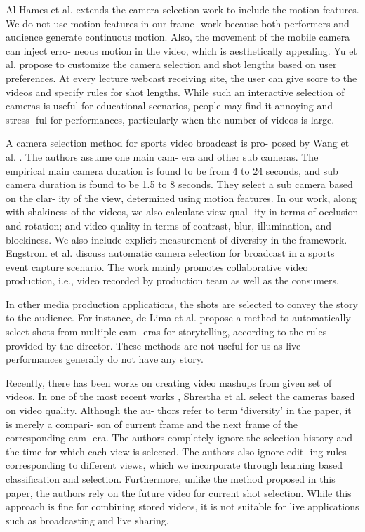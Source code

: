 \documentclass{new}
\begin{document}
Al-Hames et al. \cite{3} extends the camera selection work to include
the motion features. We do not use motion features in our frame-
work because both performers and audience generate continuous
motion. Also, the movement of the mobile camera can inject erro-
neous motion in the video, which is aesthetically appealing. Yu et
al. \cite{20} propose to customize the camera selection and shot lengths
based on user preferences. At every lecture webcast receiving site,
the user can give score to the videos and specify rules for shot
lengths. While such an interactive selection of cameras is useful
for educational scenarios, people may find it annoying and stress-
ful for performances, particularly when the number of videos is
large.

A camera selection method for sports video broadcast is pro-
posed by Wang et al. \cite{16}. The authors assume one main cam-
era and other sub cameras. The empirical main camera duration is
found to be from 4 to 24 seconds, and sub camera duration is found
to be 1.5 to 8 seconds. They select a sub camera based on the clar-
ity of the view, determined using motion features. In our work,
along with shakiness of the videos, we also calculate view qual-
ity in terms of occlusion and rotation; and video quality in terms
of contrast, blur, illumination, and blockiness. We also include
explicit measurement of diversity in the framework. Engstrom et
al. \cite{8} discuss automatic camera selection for broadcast in a sports
event capture scenario. The work mainly promotes collaborative
video production, i.e., video recorded by production team as well
as the consumers.

In other media production applications, the shots are selected to
convey the story to the audience. For instance, de Lima et al. \cite{7} propose a method to automatically select shots from multiple cam-
eras for storytelling, according to the rules provided by the director.
These methods are not useful for us as live performances generally
do not have any story.

Recently, there has been works on creating video mashups from
given set of videos. In one of the most recent works \cite{15}, Shrestha
et al. select the cameras based on video quality. Although the au-
thors refer to term ‘diversity’ in the paper, it is merely a compari-
son of current frame and the next frame of the corresponding cam-
era. The authors completely ignore the selection history and the
time for which each view is selected. The authors also ignore edit-
ing rules corresponding to different views, which we incorporate
through learning based classification and selection. Furthermore,
unlike the method proposed in this paper, the authors rely on the
future video for current shot selection. While this approach is fine
for combining stored videos, it is not suitable for live applications
such as broadcasting and live sharing.
\end{document}
